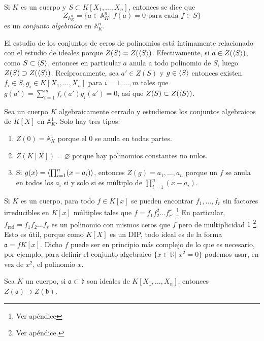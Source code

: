 \documentclass[./main.tex]{subfiles}
\begin{document}
	\begin{definition}
		Si $K$ es un cuerpo y $S\subset K[X_1, \dots, X_n]$, entonces se dice que
		\[Z_{\mathbb A^n_K} = \{a \in \mathbb A^n_K \big \vert \; f(a) = 0 \text{ para cada } f\in S \} \]
		es un \emph{conjunto algebraico} en $\mathbb A^n_K$.
	\end{definition}

	El estudio de los conjuntos de ceros de polinomios está íntimamente relacionado con el estudio de ideales porque $Z ( S) = Z ( \langle S \rangle )$. Efectivamente, si $a\in Z(\langle S \rangle)$, como $S \subset \langle S \rangle$, entonces en particular $a$ anula a todo polinomio de $S$, luego $Z ( S) \supset Z ( \langle S \rangle )$. Recíprocamente, sea $a'\in Z(S)$ y $g \in \langle S \rangle$ entonces existen $f_i\in S, g_i \in K[X_1,\dots, X_n]$ para $i = 1,\dots, m$ tales que $g(a') = \sum_{i=1}^m f_i(a')g_i(a') = 0$, así que $Z ( S) \subset Z ( \langle S \rangle )$.

	\begin{example}
		Sea un cuerpo $K$ algebraicamente cerrado y estudiemos los conjuntos algebraicos de $K[X]$ en $\mathbb A^1_K$. Solo hay tres tipos:
		\begin{enumerate}
			\item $ Z(0) = \mathbb A^1_K$ porque el $0$ se anula en todas partes.
			\item $Z(K[X]) = \varnothing$ porque hay polinomios constantes no nulos.
			\item Si $g(x) = \langle \prod_{i=1}^n (x - a_i) \rangle$, entonces $ Z(g) = {a_1,\dots, a_n}$ porque un $f$ se anula en todos los $a_i$ si y solo si es múltiplo de $\prod_{i=1}^n (x-a_i)$.
		\end{enumerate}
	\end{example}

	Si $K$ es un cuerpo, para todo $f\in K[x]$ se pueden encontrar $f_1,\dots, f_r$ sin factores irreducibles en $K[x]$ múltiples tales que $f = f_1 f_2^2 \dots f_r^r$. \footnote{Ver apéndice} En particular, $f_{\operatorname{red}} = f_1f_2 \dots f_r$ es un polinomio con mismos ceros que $f$ pero de multiplicidad $1$ \footnote{Ver apéndice.}. Esto es útil, porque como $K[X]$ es un DIP, todo ideal es de la forma $\mathfrak a = f K[x] $. Dicho $f$ puede ser en principio más complejo de lo que es necesario, por ejemplo, para definir el conjunto algebraico $\{x \in \mathbb R \vert \; x^2 = 0 \}$ podemos usar, en vez de $x^2$, el polinomio $x$.

	\begin{lemma} \label{lemita}
		Sea $K$ un cuerpo, si $\mathfrak{a}\subset \mathfrak b$ son ideales de $K[X_1,\ldots, X_n]$, entonces $Z(\mathfrak{a}) \supset Z (\mathfrak b)$.
	\end{lemma}
\end{document}
